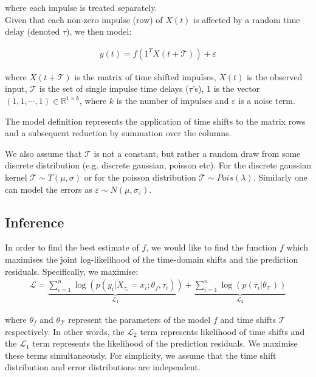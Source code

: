 \documentclass[11pt]{amsart}
\theoremstyle{definition}
\begin{document}
where each impulse is treated separately. \\

Given that each non-zero impulse (row) of $X(t)$ is affected by a random time delay (denoted $\tau$), we then model:

\begin{align}\label{Eqn:ModelSpecification}
y(t)= f(1^TX(t + \mathcal{T})) + \varepsilon
\end{align}

where $X(t + \mathcal{T})$ is the matrix of time shifted impulses, $X(t)$ is the observed input, $\mathcal{T}$ is the set of single impulse time delays ($\tau$'s), $1$ is the vector $(1,1,\cdots, 1)\in 
\mathbb{R}^{1 \times k}$, where $k$ is the number of impulses and $\varepsilon$ is a noise term. 

The model definition represents the application of time shifts to the matrix rows and a subsequent reduction by summation over the columns. 

We also assume that $\mathcal{T}$ is not a constant, but rather a random draw from some discrete distribution (e.g. discrete gaussian, poisson etc). For the discrete gaussian kernel $\mathcal{T}\sim T(\mu, \sigma)$ or for the poisson distribution $\mathcal{T}\sim Pois(\lambda)$. Similarly one can model the errors as  $\varepsilon \sim N(\mu, \sigma_{\varepsilon})$. 
\subsection{Inference}

In order to find the best estimate of $f$, we would like to find the function $f$ which maximises the joint log-likelihood of the time-domain shifts and the prediction residuals. Specifically, we maximise:
\begin{align}
    \mathcal{L} = 
    \underbrace{\sum_{i=1}^{n} \log(p(y_i | X_{\tau_i} = x_i; \theta_{f}, \tau_i))}_{\mathcal{L}_1} 
    + 
    \underbrace{\sum_{i=1}^{n} \log(p(\tau_i| \theta_{\mathcal{T}}))}_{\mathcal{L}_2}
\end{align}

where $\theta_{f}$ and $\theta_{\mathcal{T}}$ represent the parameters of the model $f$ and time shifts $\mathcal{T}$ respectively. In other words, the $\mathcal{L}_2$ term represents likelihood of time shifts and the $\mathcal{L}_1$ term represents the likelihood of the prediction residuals. We maximise these terms simultaneously. For simplicity, we assume that the time shift distribution and error distributions are independent. 
\end{document}
